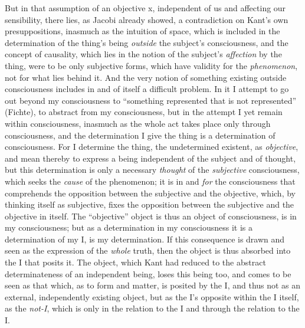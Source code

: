 But in that assumption of an objective x, independent of us and
affecting our sensibility, there lies, as Jacobi already showed, a
contradiction on Kant's own presuppositions, inasmuch as the intuition
of space, which is included in the determination of the thing's being
\emph{outside} the subject's consciousness, and the concept of
causality, which lies in the notion of the subject's \emph{affection}
by the thing, were to be only subjective forms, which have validity for
the \emph{phenomenon}, not for what lies behind it. And the very notion
of something existing outside consciousness includes in and of itself
a difficult problem. In it I attempt to go out beyond my consciousness
to ``something represented that is not represented'' (Fichte), to
abstract from my consciousness, but in the attempt I yet remain within
consciousness, inasmuch as the whole act takes place only through
consciousness, and the determination I give the thing is a
determination of consciousness. For I determine the thing, the
undetermined existent, as \emph{objective}, and mean thereby to express
a being independent of the subject and of thought, but this
determination is only a necessary \emph{thought} of the
\emph{subjective} consciousness, which seeks the \emph{cause} of the
phenomenon; it is in and \emph{for} the consciousness that comprehends
the opposition between the subjective and the objective,
which, by thinking itself as subjective, fixes the opposition between
the subjective and the objective in itself. The ``objective'' object is
thus an object of consciousness, is in my consciousness; but as a
determination in my consciousness it is a determination of my I, is my
determination. If this consequence is drawn and seen as the expression
of the \emph{whole} truth, then the object is thus absorbed into the I
that posits it. The object, which Kant had reduced to the abstract
determinateness of an independent being, loses this being too, and
comes to be seen as that which, as to form and matter, is posited by
the I, and thus not as an external, independently existing object, but
as the I's opposite within the I itself, as the \emph{not-I}, which is
only in the relation to the I and through the relation to the I.

